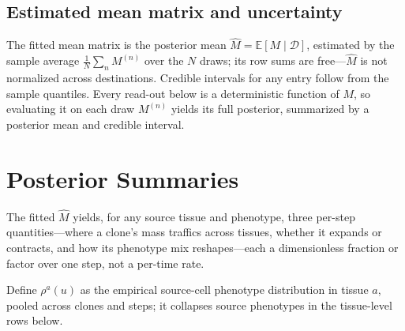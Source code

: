 \documentclass[11pt]{article}
\newcommand{\Dsp}{\mathcal{D}}                    %
\newcommand{\E}{\mathbb{E}}
\theoremstyle{definition}
\begin{document}
\subsection{Estimated mean matrix and uncertainty}

The fitted mean matrix is the posterior mean $\widehat{M} = \E[M \mid \Dsp]$,
estimated by the sample average $\tfrac{1}{N}\sum_{n} M^{(n)}$ over the $N$ draws; its row sums are
free---$\widehat{M}$ is not normalized across destinations. Credible intervals
for any entry follow from the sample quantiles. Every read-out below is a
deterministic function of $M$, so evaluating it on each draw $M^{(n)}$ yields its
full posterior, summarized by a posterior mean and credible interval.

\section{Posterior Summaries}

The fitted $\widehat{M}$ yields, for any source tissue and phenotype, three
per-step quantities---where a clone's mass traffics across tissues, whether it
expands or contracts, and how its phenotype mix reshapes---each a dimensionless
fraction or factor over one step, not a per-time rate.

Define $\rho^a(u)$ as the empirical source-cell phenotype distribution in tissue
$a$, pooled across clones and steps; it collapses source phenotypes in the
tissue-level rows below.
\end{document}
